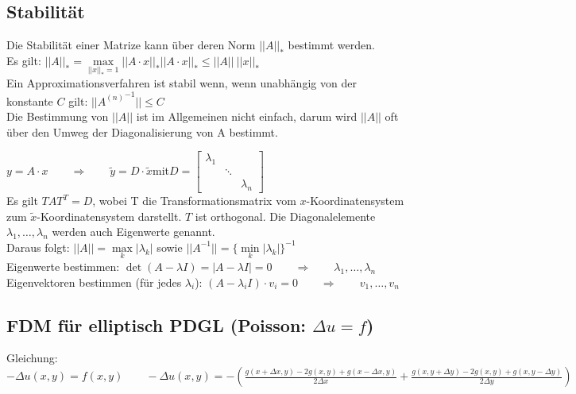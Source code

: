 \subsection{Stabilität}
Die Stabilität einer Matrize kann über deren Norm $||A||_*$ bestimmt werden.\\

Es gilt: $||A||_*=\max\limits_{||x||_*=1}||A\cdot x||_*$\qquad$||A\cdot x||_*\leq||A||~||x||_*$\\

Ein Approximationsverfahren ist stabil wenn, wenn unabhängig von der konstante $C$ gilt:
$\boxed{||{A^{(n)}}^{-1}||\leq C}$\\



Die Bestimmung von $||A||$ ist im Allgemeinen nicht einfach, darum wird $||A||$ oft über den Umweg der Diagonalisierung von A bestimmt.

$y=A\cdot x\qquad\Rightarrow\qquad\tilde{y}=D\cdot\tilde{x}$\qquad mit\qquad $D=\begin{bmatrix}\lambda_1&&\\&\ddots&\\&&\lambda_n\end{bmatrix}$\\

Es gilt $TAT^T=D$, wobei T die Transformationsmatrix vom $x$-Koordinatensystem zum $\tilde{x}$-Koordinatensystem darstellt. $T$ ist orthogonal.
Die Diagonalelemente $\lambda_1,\ldots,\lambda_n$ werden auch Eigenwerte genannt.\\

Daraus folgt: $\boxed{||A||=\max\limits_{k}|\lambda_k|}$ sowie $\boxed{||A^{-1}||=\{\min\limits_{k}|\lambda_k|\}^{-1}}$\\

Eigenwerte bestimmen: $\boxed{\det(A-\lambda I)=|A-\lambda I|=0}\qquad \Rightarrow \qquad \lambda_1,\ldots,\lambda_n$\\
Eigenvektoren bestimmen (für jedes $\lambda_i$): $(A-\lambda_i I) \cdot v_i=0\qquad \Rightarrow \qquad v_1,\ldots,v_n$\\

\subsection{FDM für elliptisch PDGL (Poisson: $\Delta u = f$)}

Gleichung:    $-\Delta u(x,y)= f(x,y) \qquad 
-\Delta u(x,y) = -\left(\frac{g(x+\Delta x,y ) -2 g(x,y)+ g(x-\Delta x,y)}{2\Delta x} +
\frac{g(x,y+\Delta y) -2 g(x,y)+ g(x,y-\Delta y)}{2\Delta y}\right)$\\

